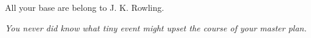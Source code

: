 All your base are belong to J. K. Rowling.

\emph{You never did know what tiny event might upset the course of your master plan.}

